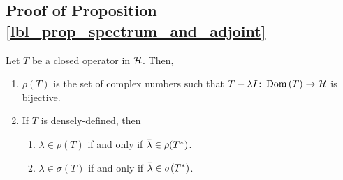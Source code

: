 \subsection{Proof of Proposition \eqref{lbl_prop_spectrum_and_adjoint}}\label{proof_lbl_prop_spectrum_and_adjoint}

\begin{proposition}
  Let $T$ be a closed operator in $\mathcal{H}$. Then,
    \begin{enumerate}[label = (\alph*)]
      \item $\rho(T)$ is the set of complex numbers such that $T - \lambda I \colon \operatorname{Dom}\left(T\right) \to \mathcal{H}$ is bijective.
      \item If $T$ is densely-defined, then
      \begin{enumerate}[label = (\roman*)]
        \item $\lambda \in \rho(T)$ if and only if $\conjugate{\lambda} \in \rho(T^*)$.
        \item $\lambda \in \sigma(T)$  if and only if $\conjugate{\lambda} \in \sigma(T^*)$.
      \end{enumerate}
  \end{enumerate}
\end{proposition}
